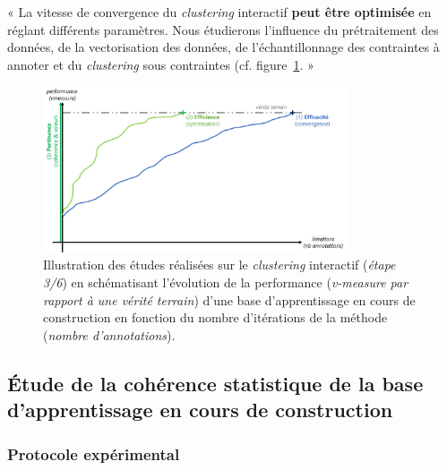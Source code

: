 		\begin{tcolorbox}[
			title=\textbf{Hypothèse de pertinence},
			colback=gray!20,
			colframe=gray!50!black!75,
			width=\linewidth
		]
			« La vitesse de convergence du \textit{clustering} interactif \textbf{peut être optimisée} en réglant différents paramètres. Nous étudierons l'influence du prétraitement des données, de la vectorisation des données, de l'échantillonnage des contraintes à annoter et du \textit{clustering} sous contraintes (cf. figure~\ref{figure:HYPOTHESE-PERTINENCE}. »
			
			
			\begin{figure}[H]
				\centering
				\includegraphics[width=0.8\textwidth]{figures/hypotheses-03-pertinence}
				\caption{Illustration des études réalisées sur le \textit{clustering} interactif (\textit{étape 3/6}) en schématisant l'évolution de la performance (\textit{v-measure par rapport à une vérité terrain}) d'une base d'apprentissage en cours de construction en fonction du nombre d'itérations de la méthode (\textit{nombre d'annotations}).}
				\label{figure:HYPOTHESE-PERTINENCE}
			\end{figure}

		\end{tcolorbox}
		
		\subsection{Étude de la cohérence statistique de la base d'apprentissage en cours de construction}
		
			\subsubsection{Protocole expérimental}

